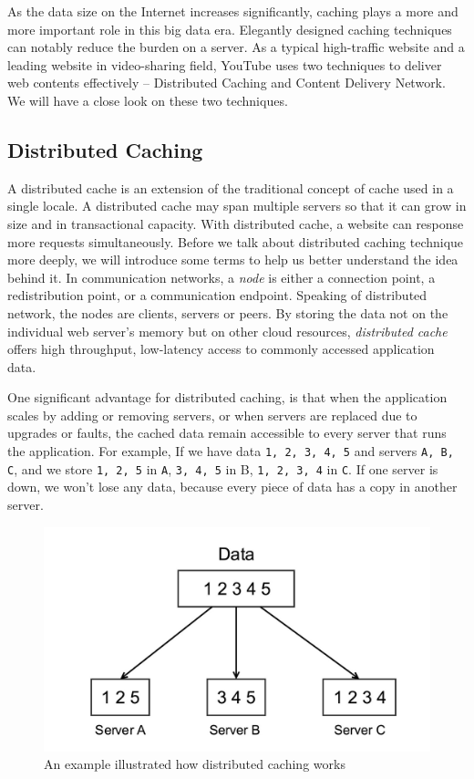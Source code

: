 As the data size on the Internet increases significantly, caching plays a more and more important role in this big data era. Elegantly designed caching techniques can notably reduce the burden on a server.  
As a typical high-traffic website and a leading website in video-sharing field, YouTube uses two techniques to deliver web contents effectively -- Distributed Caching and Content Delivery Network. We will have a close look on these two techniques.
\subsection{Distributed Caching}
A distributed cache is an extension of the traditional concept of cache used in a single locale. A distributed cache may span multiple servers so that it can grow in size and in transactional capacity\cite{wiki:dcache}. With distributed cache, a website can response more requests simultaneously. Before we talk about distributed caching technique more deeply, we will introduce some terms to help us better understand the idea behind it. In communication networks, a \textit{node} is either a connection point, a redistribution point, or a communication endpoint. Speaking of distributed network, the nodes are clients, servers or peers. By storing the data not on the individual web server's memory but on other cloud resources, \textit{distributed cache} offers high throughput, low-latency access to commonly accessed application data.

One significant advantage for distributed caching, is that when the application scales by adding or removing servers, or when servers are replaced due to upgrades or faults, the cached data remain accessible to every server that runs the application. For example, If we have data \texttt{1, 2, 3, 4, 5} and servers \texttt{A, B, C}, and we store \texttt{1, 2, 5} in \texttt{A}, \texttt{3, 4, 5} in B, \texttt{1, 2, 3, 4} in \texttt{C}. If one server is down, we won't lose any data, because every piece of data has a copy in another server.
\begin{figure}[H]
	\centering
	\includegraphics[width=0.7\linewidth]{server.jpg}
	\caption{An example illustrated how distributed caching works}
\end{figure}

